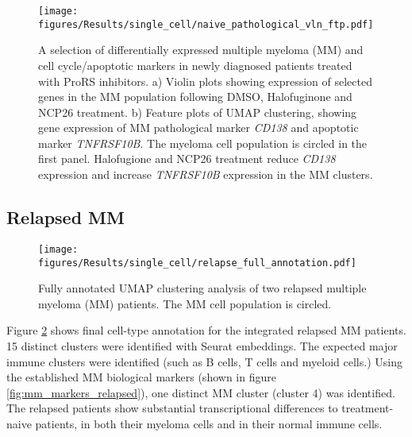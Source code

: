 \begin{figure}[htb]
\centering
\texttt{[image: figures/Results/single\_cell/naive\_pathological\_vln\_ftp.pdf]}
\caption[scRNA-seq differentially expressed MM markers- newly diagnosed patients]{A selection of differentially expressed multiple myeloma (MM) and cell cycle/apoptotic markers in newly diagnosed patients treated with ProRS inhibitors.
    a) Violin plots showing expression of selected genes in the MM population following DMSO, Halofuginone and NCP26 treatment.
    b) Feature plots of UMAP clustering, showing gene expression of MM pathological marker \textit{CD138} and apoptotic marker \textit{TNFRSF10B}.
The myeloma cell population is circled in the first panel.
Halofugione and NCP26 treatment reduce \textit{CD138} expression and increase \textit{TNFRSF10B} expression in the MM clusters.}
\label{fig:naive_path_vln_ftp}
\end{figure}



\subsection{Relapsed MM}

\begin{figure}[hpt]
\centering
\texttt{[image: figures/Results/single\_cell/relapse\_full\_annotation.pdf]}
\caption[Relapsed MM scRNA-seq full annotation]{Fully annotated UMAP clustering analysis of two relapsed multiple myeloma (MM) patients.
The MM cell population is circled.}
\label{fig:full_anno_relapse}
\end{figure}

Figure \ref{fig:full_anno_relapse} shows final cell-type annotation for the integrated relapsed MM patients.
15 distinct clusters were identified with Seurat embeddings.
The expected major immune clusters were identified (such as B cells, T cells and myeloid cells.)
Using the established MM biological markers (shown in figure \ref{fig:mm_markers_relapsed}), one distinct MM cluster (cluster 4) was identified.
The relapsed patients show substantial transcriptional differences to treatment-naive patients, in both their myeloma cells and in their normal immune cells.

